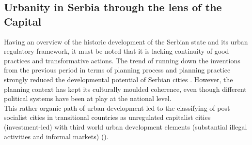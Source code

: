 \documentclass[11pt]{report}
\begin{document}
\subsection{Urbanity in Serbia through the lens of the Capital}

Having an overview of the historic development of the Serbian state and its urban regulatory framework, it must be noted that it is lacking continuity of good practices and transformative actions. The trend of running down the inventions from the previous period in terms of planning process and planning practice strongly reduced the developmental potential of Serbian cities \href{}{\citealt{peric_evolution_2016}}. However, the planning context has kept its culturally moulded coherence, even though different political systems have been at play at the national level.
\\  
  
This rather organic path of urban development led to the classifying of post-socialist cities in transitional countries as unregulated capitalist cities (investment-led) with third world urban development elements (substantial illegal activities and informal markets) (\href{}{\citealt{petrovic_cities_2009}}).
\\ 
\end{document}
